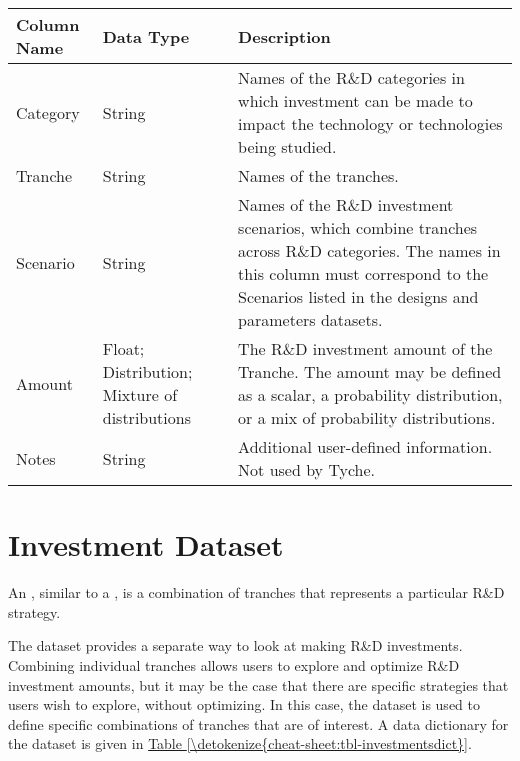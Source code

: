 \documentclass[letterpaper,10pt,english]{sphinxmanual}
\begin{document}
\begin{savenotes}\sphinxattablestart
\centering
{}
\sphinxthecaptionisattop
{}\label{\detokenize{cheat-sheet:table-5}}\label{\detokenize{cheat-sheet:tbl-tranchesdict}}
\sphinxaftertopcaption
\begin{tabulary}{\linewidth}[t]{|T|T|T|}
\hline
\sphinxstyletheadfamily 
Column Name
&\sphinxstyletheadfamily 
Data Type
&\sphinxstyletheadfamily 
Description
\\
\hline
Category
&
String
&
Names of the R\&D categories in which investment can be made to impact the technology or technologies being studied.
\\
\hline
Tranche
&
String
&
Names of the tranches.
\\
\hline
Scenario
&
String
&
Names of the R\&D investment scenarios, which combine tranches across R\&D categories. The names in this column must correspond to the Scenarios listed in the designs and parameters datasets.
\\
\hline
Amount
&
Float; Distribution; Mixture of distributions
&
The R\&D investment amount of the Tranche. The amount may be defined as a scalar, a probability distribution, or a mix of probability distributions.
\\
\hline
Notes
&
String
&
Additional user-defined information. Not used by Tyche.
\\
\hline
\end{tabulary}
\par
\sphinxattableend\end{savenotes}


\section{Investment Dataset}
\label{\detokenize{cheat-sheet:investment-dataset}}
An , similar to a , is a combination of tranches that represents a particular R\&D strategy.

The  dataset provides a separate way to look at making R\&D investments. Combining individual tranches allows users to explore and optimize R\&D investment amounts, but it may be the case that there are specific strategies that users wish to explore, without optimizing. In this case, the  dataset is used to define specific combinations of tranches that are of interest. A data dictionary for the  dataset is given in \hyperref[\detokenize{cheat-sheet:tbl-investmentsdict}]{Table \ref{\detokenize{cheat-sheet:tbl-investmentsdict}}}.
\end{document}
